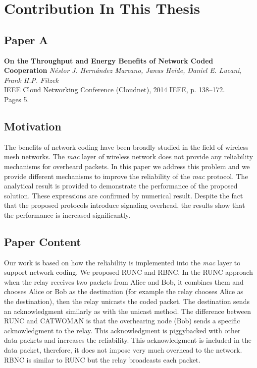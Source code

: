\section{Contribution In This Thesis}\label{sec:contributions}

\subsection{Paper A}
\textbf{On the Throughput and Energy Benefits of Network Coded Cooperation}
\textit{N\'estor J. Hern\'andez Marcano, Janus Heide, Daniel E. Lucani, Frank H.P. Fitzek}
\\  IEEE Cloud Networking Conference (Cloudnet), 2014 IEEE, p. 138--172.
\\ Pages 5.

\subsection*{Motivation}
The benefits of network coding have been broadly studied in the field of wireless mesh networks. The \textit{mac} layer of wireless network does not provide any reliability mechanisms for overheard packets. In this paper we address this problem and we provide different mechanisms to improve the reliability of the \textit{mac} protocol. The analytical result is provided to demonstrate the performance of the proposed solution. These expressions are confirmed by numerical result. Despite the fact that the proposed protocols introduce signaling overhead, the results show that the performance is increased significantly.

\subsection*{Paper Content}
Our work is based on how the reliability is implemented into the \textit{mac} layer to support network coding. We proposed RUNC and RBNC. In the RUNC approach when the relay receives two packets from Alice and Bob, it combines them and chooses Alice or Bob as the destination (for example the relay chooses Alice as the destination), then the relay unicasts the coded packet. The destination sends an acknowledgment similarly as with the unicast method. The difference between RUNC and CATWOMAN is that the overhearing node (Bob) sends a specific acknowledgment to the relay. This acknowledgment is piggybacked with other data packets and increases the reliability. This acknowledgment is included in the data packet, therefore, it does not impose very much overhead to the network. RBNC is similar to RUNC but the relay broadcasts each packet.

